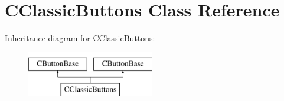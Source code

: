\hypertarget{class_c_classic_buttons}{\section{C\-Classic\-Buttons Class Reference}
\label{class_c_classic_buttons}
}
Inheritance diagram for C\-Classic\-Buttons\-:\begin{figure}[H]
\begin{center}
\leavevmode
\includegraphics[height=2.000000cm]{class_c_classic_buttons}
\end{center}
\end{figure}
